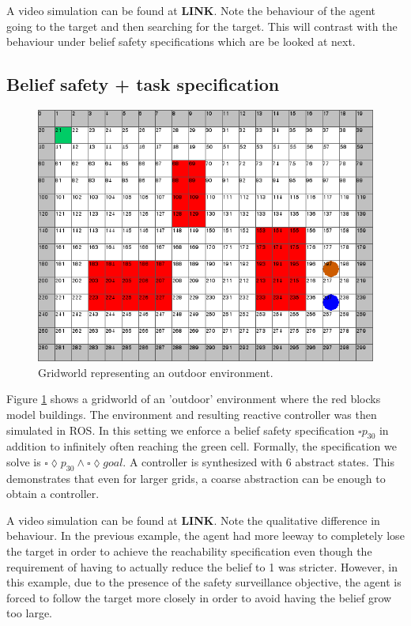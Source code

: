  A video simulation can be found at \textbf{LINK}. Note the behaviour of the agent going to the target and then searching for the target. This will contrast with the behaviour under belief safety specifications which are be looked at next. 

\subsection{Belief safety + task specification}
\begin{figure}
\centering
\includegraphics[scale=0.3]{case2.png}\caption{Gridworld representing an outdoor environment.}\label{fig:case2}
\end{figure}
Figure \ref{fig:case2} shows a gridworld of an 'outdoor' environment where the red blocks model buildings. The environment and resulting reactive controller was then simulated in ROS.
In this setting we enforce a belief safety specification $\square p_{30}$ in addition to infinitely often reaching the green cell. Formally, the specification we solve is $\square \lozenge p_{30} \wedge \square \lozenge goal$. 
A controller is synthesized with 6 abstract states. This demonstrates that even for larger grids, a coarse abstraction can be enough to obtain a controller.
 
 A video simulation can be found at \textbf{LINK}. Note the qualitative difference in behaviour. In the previous example, the agent had more leeway to completely lose the target in order to achieve the reachability specification even though the requirement of having to actually reduce the belief to 1 was stricter. However, in this example, due to the presence of the safety surveillance objective, the agent is forced to follow the target more closely in order to avoid having the belief grow too large. 
